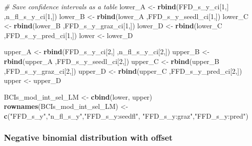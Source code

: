 \documentclass[
]{article}
\newenvironment{Shaded}{\begin{snugshade}}{\end{snugshade}}
\newcommand{\CommentTok}[1]{\textcolor[rgb]{0.56,0.35,0.01}{\textit{#1}}}
\newcommand{\DecValTok}[1]{\textcolor[rgb]{0.00,0.00,0.81}{#1}}
\newcommand{\KeywordTok}[1]{\textcolor[rgb]{0.13,0.29,0.53}{\textbf{#1}}}
\newcommand{\NormalTok}[1]{#1}
\newcommand{\StringTok}[1]{\textcolor[rgb]{0.31,0.60,0.02}{#1}}
\begin{document}
\begin{Shaded}
\begin{Highlighting}[]
\CommentTok{# Save confidence intervals as a table}
\NormalTok{lower_A <-}\StringTok{ }\KeywordTok{rbind}\NormalTok{(FFD_s_y_ci[}\DecValTok{1}\NormalTok{,] ,n_fl_s_y_ci[}\DecValTok{1}\NormalTok{,])}
\NormalTok{lower_B <-}\StringTok{ }\KeywordTok{rbind}\NormalTok{(lower_A ,FFD_s_y_seedl_ci[}\DecValTok{1}\NormalTok{,])}
\NormalTok{lower_C <-}\StringTok{ }\KeywordTok{rbind}\NormalTok{(lower_B ,FFD_s_y_graz_ci[}\DecValTok{1}\NormalTok{,])}
\NormalTok{lower_D <-}\StringTok{ }\KeywordTok{rbind}\NormalTok{(lower_C ,FFD_s_y_pred_ci[}\DecValTok{1}\NormalTok{,])}
\NormalTok{lower <-}\StringTok{ }\NormalTok{lower_D}

\NormalTok{upper_A <-}\StringTok{ }\KeywordTok{rbind}\NormalTok{(FFD_s_y_ci[}\DecValTok{2}\NormalTok{,] ,n_fl_s_y_ci[}\DecValTok{2}\NormalTok{,])}
\NormalTok{upper_B <-}\StringTok{ }\KeywordTok{rbind}\NormalTok{(upper_A ,FFD_s_y_seedl_ci[}\DecValTok{2}\NormalTok{,])}
\NormalTok{upper_C <-}\StringTok{ }\KeywordTok{rbind}\NormalTok{(upper_B ,FFD_s_y_graz_ci[}\DecValTok{2}\NormalTok{,])}
\NormalTok{upper_D <-}\StringTok{ }\KeywordTok{rbind}\NormalTok{(upper_C ,FFD_s_y_pred_ci[}\DecValTok{2}\NormalTok{,])}
\NormalTok{upper <-}\StringTok{ }\NormalTok{upper_D}


\NormalTok{BCIs_mod_int_sel_LM <-}\StringTok{ }\KeywordTok{cbind}\NormalTok{(lower, upper) }
\KeywordTok{rownames}\NormalTok{(BCIs_mod_int_sel_LM) <-}\StringTok{ }\KeywordTok{c}\NormalTok{(}\StringTok{"FFD_s_y"}\NormalTok{,}\StringTok{"n_fl_s_y"}\NormalTok{,}\StringTok{"FFD_s_y:seedfl"}\NormalTok{,}
                                   \StringTok{"FFD_s_y:graz"}\NormalTok{,}\StringTok{"FFD_s_y:pred"}\NormalTok{)}
\end{Highlighting}
\end{Shaded}

\hypertarget{negative-binomial-distribution-with-offset}{%
\subsubsection{Negative binomial distribution with
offset}\label{negative-binomial-distribution-with-offset}}
\end{document}
